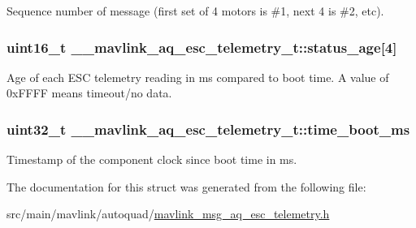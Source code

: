 Sequence number of message (first set of 4 motors is \#1, next 4 is \#2, etc). 

\hypertarget{struct____mavlink__aq__esc__telemetry__t_a7ce9cc1ba54e799951b6f57cba3e1874}{
\subsubsection[{status\+\_\+age}]{\setlength{\rightskip}{0pt plus 5cm}uint16\+\_\+t \+\_\+\+\_\+mavlink\+\_\+aq\+\_\+esc\+\_\+telemetry\+\_\+t\+::status\+\_\+age\mbox{[}4\mbox{]}}}\label{struct____mavlink__aq__esc__telemetry__t_a7ce9cc1ba54e799951b6f57cba3e1874}


Age of each E\+S\+C telemetry reading in ms compared to boot time. A value of 0x\+F\+F\+F\+F means timeout/no data. 

\hypertarget{struct____mavlink__aq__esc__telemetry__t_a92808787ccaee816434034999e24e2b1}{
\subsubsection[{time\+\_\+boot\+\_\+ms}]{\setlength{\rightskip}{0pt plus 5cm}uint32\+\_\+t \+\_\+\+\_\+mavlink\+\_\+aq\+\_\+esc\+\_\+telemetry\+\_\+t\+::time\+\_\+boot\+\_\+ms}}\label{struct____mavlink__aq__esc__telemetry__t_a92808787ccaee816434034999e24e2b1}


Timestamp of the component clock since boot time in ms. 



The documentation for this struct was generated from the following file\+:\begin{DoxyCompactItemize}
\item 
src/main/mavlink/autoquad/\hyperlink{mavlink__msg__aq__esc__telemetry_8h}{mavlink\+\_\+msg\+\_\+aq\+\_\+esc\+\_\+telemetry.\+h}\end{DoxyCompactItemize}
